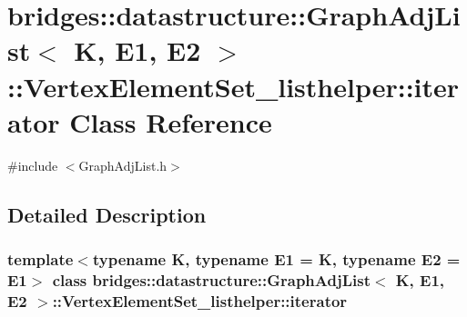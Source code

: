 \hypertarget{classbridges_1_1datastructure_1_1_graph_adj_list_1_1_vertex_element_set__listhelper_1_1iterator}{}\section{bridges\+:\+:datastructure\+:\+:Graph\+Adj\+List$<$ K, E1, E2 $>$\+:\+:Vertex\+Element\+Set\+\_\+listhelper\+:\+:iterator Class Reference}
\label{classbridges_1_1datastructure_1_1_graph_adj_list_1_1_vertex_element_set__listhelper_1_1iterator}


{\ttfamily \#include $<$Graph\+Adj\+List.\+h$>$}



\subsection{Detailed Description}
\subsubsection*{template$<$typename K, typename E1 = K, typename E2 = E1$>$\newline
class bridges\+::datastructure\+::\+Graph\+Adj\+List$<$ K, E1, E2 $>$\+::\+Vertex\+Element\+Set\+\_\+listhelper\+::iterator}

